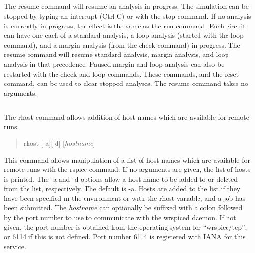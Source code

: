 \subsection{}


The {\cb resume} command will resume an analysis in progress.  The
simulation can be stopped by typing an interrupt ({\kb Ctrl-C}) or
with the {\cb stop} command.  If no analysis is currently in
progress, the effect is the same as the {\cb run} command.  Each
circuit can have one each of a standard analysis, a loop analysis
(started with the {\cb loop} command), and a margin analysis (from
the {\cb check} command) in progress.  The {\cb resume} command will
resume standard analysis, margin analysis, and loop analysis in that
precedence.  Paused margin and loop analysis can also be restarted
with the {\cb check} and {\cb loop} commands.  These commands, and
the {\cb reset} command, can be used to clear stopped analyses.  The
{\cb resume} command takes no arguments.

\subsection{}
\label{rhost}


The {\cb rhost} command allows addition of host names which are
available for remote {\WRspice} runs.
\begin{quote}\vt
rhost [-a][-d] [{\it hostname\/}]
\end{quote}
This command allows manipulation of a list of host names which are
available for remote {\WRspice} runs with the {\cb rspice} command. 
If no arguments are given, the list of hosts is printed.  The {\vt -a}
and {\vt -d} options allow a host name to be added to or deleted from
the list, respectively.  The default is {\vt -a}.  Hosts are added to
the list if they have been specified in the environment or with the
{\et rhost} variable, and a job has been submitted.  The {\it
hostname} can optionally be suffixed with a colon followed by the port
number to use to communicate with the {\vt wrspiced} daemon.  If not
given, the port number is obtained from the operating system for
``wrspice/tcp'', or 6114 if this is not defined.  Port number 6114 is
registered with IANA for this service.

